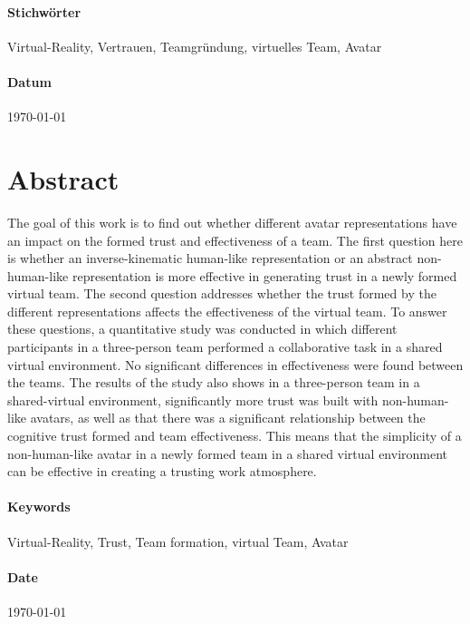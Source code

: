 \documentclass[a4paper,11pt]{article}%
\renewcommand{\\}{\vspace*{0.5\baselineskip} \newline}
\begin{document}
			\paragraph{Stichwörter}
			Virtual-Reality, Vertrauen, Teamgründung, virtuelles Team, Avatar
			
			\paragraph{Datum}
			{\today}
	\newpage
	
\section*{Abstract}
The goal of this work is to find out whether different avatar representations have an impact on the formed trust and effectiveness of a team. The first question here is whether an inverse-kinematic human-like representation or an abstract non-human-like representation is more effective in generating trust in a newly formed virtual team. The second question addresses whether the trust formed by the different representations affects the effectiveness of the virtual team. To answer these questions, a quantitative study was conducted in which different participants in a three-person team performed a collaborative task in a shared virtual environment. No significant differences in effectiveness were found between the teams. The results of the study also shows in a three-person team in a shared-virtual environment, significantly more trust was built with non-human-like avatars, as well as that there was a significant relationship between the cognitive trust formed and team effectiveness. This means that the simplicity of a non-human-like avatar in a newly formed team in a shared virtual environment can be effective in creating a trusting work atmosphere. 
	
			\paragraph{Keywords}
			Virtual-Reality, Trust, Team formation, virtual Team, Avatar
			
			\paragraph{Date}
			{\today}
	\newpage
	\tableofcontents
	\newpage

\listoffigures%
\newpage
\listoftables%
\newpage
	
\end{document}
